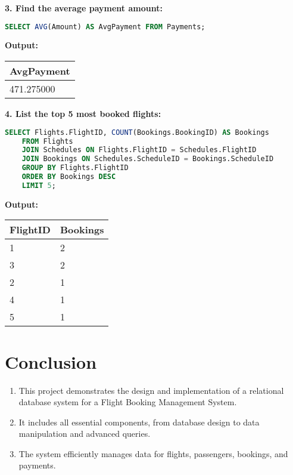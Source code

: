 \documentclass[14pt,a4paper]{extarticle}
\begin{document}
    \textbf{3. Find the average payment amount:}
    \begin{lstlisting}[language=SQL]
    SELECT AVG(Amount) AS AvgPayment FROM Payments;
    \end{lstlisting}
    
    \textbf{Output:}
    \begin{table}[h!]
\centering
\begin{tabular}{|l|}
    \hline
    \textbf{AvgPayment} \\ \hline
    471.275000 \\ \hline
\end{tabular}
\end{table}

    \textbf{4. List the top 5 most booked flights:}
    \begin{lstlisting}[language=SQL]
    SELECT Flights.FlightID, COUNT(Bookings.BookingID) AS Bookings
    FROM Flights
    JOIN Schedules ON Flights.FlightID = Schedules.FlightID
    JOIN Bookings ON Schedules.ScheduleID = Bookings.ScheduleID
    GROUP BY Flights.FlightID
    ORDER BY Bookings DESC
    LIMIT 5;
    \end{lstlisting}
    
    \textbf{Output:}
    \begin{table}[h!]
\centering
\begin{tabular}{|l|l|}
    \hline
    \textbf{FlightID} & \textbf{Bookings} \\ \hline
    1  & 2 \\ \hline
    3  & 2 \\ \hline
    2  & 1 \\ \hline
    4  & 1 \\ \hline
    5  & 1 \\ \hline
\end{tabular}
\end{table}

\section{Conclusion}

\begin{enumerate}
    \item This project demonstrates the design and implementation of a relational database system for a Flight Booking Management System.
    \item It includes all essential components, from database design to data manipulation and advanced queries.
    \item The system efficiently manages data for flights, passengers, bookings, and payments.
\end{enumerate}
\end{document}
